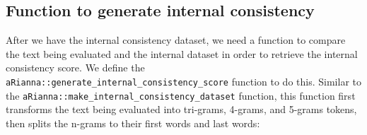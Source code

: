 \documentclass[11pt,]{article}
\newenvironment{Shaded}{\begin{snugshade}}{\end{snugshade}}
\newcommand{\CommentTok}[1]{\textcolor[rgb]{0.56,0.35,0.01}{\textit{#1}}}
\newcommand{\DataTypeTok}[1]{\textcolor[rgb]{0.13,0.29,0.53}{#1}}
\newcommand{\DecValTok}[1]{\textcolor[rgb]{0.00,0.00,0.81}{#1}}
\newcommand{\ErrorTok}[1]{\textcolor[rgb]{0.64,0.00,0.00}{\textbf{#1}}}
\newcommand{\KeywordTok}[1]{\textcolor[rgb]{0.13,0.29,0.53}{\textbf{#1}}}
\newcommand{\NormalTok}[1]{#1}
\newcommand{\OperatorTok}[1]{\textcolor[rgb]{0.81,0.36,0.00}{\textbf{#1}}}
\newcommand{\StringTok}[1]{\textcolor[rgb]{0.31,0.60,0.02}{#1}}
\begin{document}
\begin{Shaded}
\end{Shaded}

\hypertarget{function-to-generate-internal-consistency}{%
\subsection{Function to generate internal consistency}\label{function-to-generate-internal-consistency}}

After we have the internal consistency dataset, we need a function to compare the text being evaluated and the internal dataset in order to retrieve the internal consistency score. We define the \texttt{aRianna::generate\_internal\_consistency\_score} function to do this. Similar to the \texttt{aRianna::make\_internal\_consistency\_dataset} function, this function first transforms the text being evaluated into tri-grams, 4-grams, and 5-grams tokens, then splits the n-grams to their first words and last words:
\end{document}
